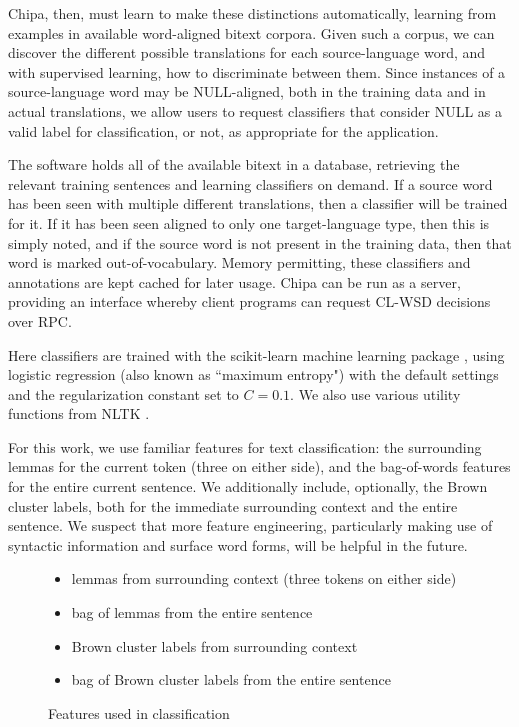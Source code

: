\documentclass[10pt, a4paper]{article}
\begin{document}
Chipa, then, must learn to make these distinctions automatically, learning from
examples in available word-aligned bitext corpora. Given such a corpus, we can
discover the different possible translations for each source-language word, and
with supervised learning, how to discriminate between them.  Since instances of
a source-language word may be NULL-aligned, both in the training data and in
actual translations, we allow users to request classifiers that consider NULL
as a valid label for classification, or not, as appropriate for the
application.

The software holds all of the available bitext in a database, retrieving the
relevant training sentences and learning classifiers on demand.
If a source word has been seen with multiple different translations, then a
classifier will be trained for it. If it has been seen aligned to only one
target-language type, then this is simply noted, and if the source word is not
present in the training data, then that word is marked out-of-vocabulary.
Memory permitting, these classifiers and annotations are kept cached for later
usage. Chipa can be run as a server, providing an interface whereby client
programs can request CL-WSD decisions over RPC.

Here classifiers are trained with the scikit-learn machine learning package
\cite{scikit-learn}, using logistic regression (also known as ``maximum
entropy") with the default settings and the regularization constant set to
$C=0.1$. We also use various utility functions from NLTK \cite{nltkbook}. 

For this work, we use familiar features for text classification: the
surrounding lemmas for the current token (three on either side), and the
bag-of-words features for the entire current sentence. We additionally include,
optionally, the Brown cluster labels, both for the immediate surrounding context
and the entire sentence.
We suspect that more feature engineering, particularly making use of syntactic
information and surface word forms, will be helpful in the future.

\begin{figure}[t!]
  \begin{itemize}
    \item lemmas from surrounding context (three tokens on either side)
    \item bag of lemmas from the entire sentence
    \item Brown cluster labels from surrounding context
    \item bag of Brown cluster labels from the entire sentence
  \end{itemize}
\caption{Features used in classification}
\label{fig:features}
\end{figure}
\end{document}
